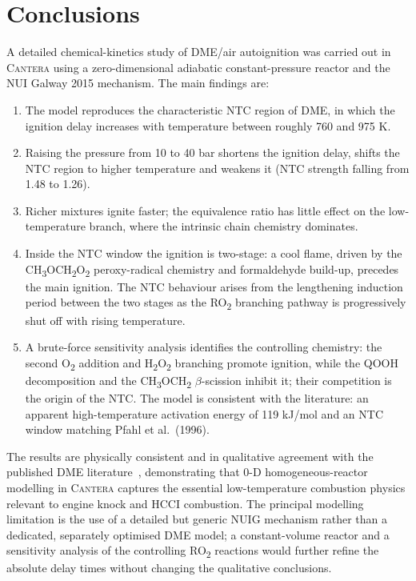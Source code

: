 \documentclass[11pt,a4paper]{article}
\begin{document}
\section{Conclusions}
A detailed chemical-kinetics study of DME/air autoignition was carried out in
\textsc{Cantera} using a zero-dimensional adiabatic constant-pressure reactor and
the NUI Galway 2015 mechanism. The main findings are:
\begin{enumerate}
  \item The model reproduces the characteristic NTC region of DME, in which the
  ignition delay increases with temperature between roughly 760 and 975 K.
  \item Raising the pressure from 10 to 40 bar shortens the ignition delay,
  shifts the NTC region to higher temperature and weakens it (NTC strength
  falling from 1.48 to 1.26).
  \item Richer mixtures ignite faster; the equivalence ratio has little effect on
  the low-temperature branch, where the intrinsic chain chemistry dominates.
  \item Inside the NTC window the ignition is two-stage: a cool flame, driven by
  the CH\textsubscript{3}OCH\textsubscript{2}O\textsubscript{2} peroxy-radical
  chemistry and formaldehyde build-up, precedes the main ignition. The NTC
  behaviour arises from the lengthening induction period between the two stages
  as the RO\textsubscript{2} branching pathway is progressively shut off with
  rising temperature.
  \item A brute-force sensitivity analysis identifies the controlling chemistry:
  the second O\textsubscript{2} addition and H\textsubscript{2}O\textsubscript{2}
  branching promote ignition, while the QOOH decomposition and the
  CH\textsubscript{3}OCH\textsubscript{2} $\beta$-scission inhibit it; their
  competition is the origin of the NTC. The model is consistent with the
  literature: an apparent high-temperature activation energy of 119 kJ/mol and an
  NTC window matching Pfahl et al.\ (1996).
\end{enumerate}
The results are physically consistent and in qualitative agreement with the
published DME literature~\cite{zhao2008,burke2015}, demonstrating that 0-D
homogeneous-reactor modelling in \textsc{Cantera} captures the essential
low-temperature combustion physics relevant to engine knock and HCCI combustion.
The principal modelling limitation is the use of a detailed but generic NUIG
mechanism rather than a dedicated, separately optimised DME model; a
constant-volume reactor and a sensitivity analysis of the controlling
RO\textsubscript{2} reactions would further refine the absolute delay times
without changing the qualitative conclusions.
\end{document}
